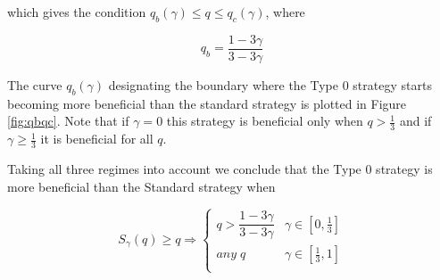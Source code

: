 \documentclass[letterpaper,12pt]{report}
\begin{document}
which gives the condition $q_b(\gamma)\leq q \leq q_c(\gamma)$, where 

\begin{equation}\label{eq:qb}
q_b= \dfrac{1-3\gamma}{3-3\gamma}
\end{equation}

The curve $q_b(\gamma)$ designating the boundary where the Type 0 strategy starts becoming more beneficial than the standard strategy is plotted in Figure \ref{fig:qbqc}.
Note that if $\gamma=0$ this strategy is beneficial only when $q>\frac{1}{3}$ and if $\gamma\geq\frac{1}{3}$ it is beneficial for all $q$.

\noindent%
\begin{minipage}{\linewidth}
\label{fig:qbqc}
\end{minipage}
\linebreak


Taking all three regimes into account we conclude that the Type 0 strategy is more beneficial than the Standard strategy when

\begin{equation}\label{eq:0overhonest}
S_{\gamma}(q)\geq q \Longrightarrow
\begin{cases}
q>\dfrac{1-3\gamma}{3-3\gamma} & \gamma\in [0,\frac{1}{3}] \\ 
\mathit{any\;} q & \gamma\in [\frac{1}{3},1] \\ 
\end{cases}
\end{equation}
\end{document}
